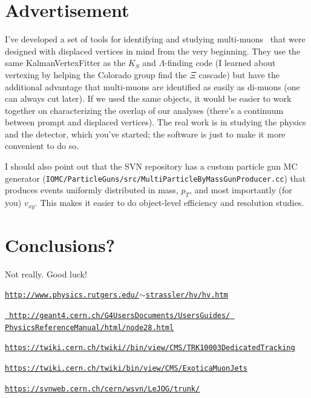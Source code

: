 \documentclass[12pt]{article}
\begin{document}
\clearpage
\section{Advertisement}

I've developed a set of tools for identifying and studying
multi-muons~\cite{mytools} that were designed with displaced vertices
in mind from the very beginning.  They use the same KalmanVertexFitter
as the $K_S$ and $\Lambda$-finding code (I learned about vertexing by
helping the Colorado group find the $\Xi$ cascade) but have the
additional advantage that multi-muons are identified as easily as
di-muons (one can always cut later).  If we used the same objects, it
would be easier to work together on characterizing the overlap of our
analyses (there's a continuum between prompt and displaced vertices).
The real work is in studying the physics and the detector, which
you've started; the software is just to make it more convenient to do
so.

I should also point out that the SVN repository\cite{svn} has a custom
particle gun MC generator ({\tt IOMC/ParticleGuns/src/MultiParticleByMassGunProducer.cc})
that produces events uniformly distributed in mass, $p_T$, and most
importantly (for you) $v_{xy}$.  This makes it easier to do
object-level efficiency and resolution studies.

\section{Conclusions?}

Not really.  Good luck!

\begin{thebibliography}{99}

  \href{http://www.physics.rutgers.edu/~strassler/hv/hv.htm}{\tt http://www.physics.rutgers.edu/$\sim$strassler/hv/hv.htm}

  \href{http://geant4.cern.ch/G4UsersDocuments/UsersGuides/PhysicsReferenceManual/html/node28.html}{\tt
    http://geant4.cern.ch/G4UsersDocuments/UsersGuides/ PhysicsReferenceManual/html/node28.html}

  \href{https://twiki.cern.ch/twiki//bin/view/CMS/TRK10003DedicatedTracking}{\tt https://twiki.cern.ch/twiki//bin/view/CMS/TRK10003DedicatedTracking}

  \href{https://twiki.cern.ch/twiki/bin/view/CMS/ExoticaMuonJets}{\tt https://twiki.cern.ch/twiki/bin/view/CMS/ExoticaMuonJets}

  \href{https://svnweb.cern.ch/cern/wsvn/LeJOG/trunk/}{\tt https://svnweb.cern.ch/cern/wsvn/LeJOG/trunk/}

\end{thebibliography}
\end{document}

